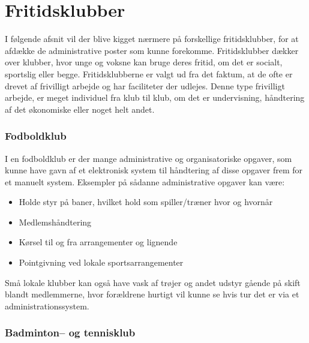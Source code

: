\chapter{Fritidsklubber} \label{chap:Fritidsklubber}

I følgende afsnit vil der blive kigget nærmere på forskellige fritidsklubber, for at afdække de administrative
poster som kunne forekomme. Fritidsklubber dækker over klubber, hvor unge og voksne kan bruge deres fritid, om
det er socialt, sportslig eller begge. Fritidsklubberne er valgt ud fra det faktum, at de ofte er drevet af frivilligt
arbejde og har faciliteter der udlejes. Denne type frivilligt arbejde, er meget individuel fra klub til klub, om det er undervisning, håndtering af det
økonomiske eller noget helt andet.



\subsection{Fodboldklub} \label{Fodbold}

I en fodboldklub er der mange administrative og organisatoriske opgaver, som kunne have gavn af et elektronisk
system til håndtering af disse opgaver frem for et manuelt system. Eksempler på sådanne administrative opgaver
kan være:

\begin{itemize}
  \item Holde styr på baner, hvilket hold som spiller/træner hvor og hvornår
  \item Medlemshåndtering
  \item Kørsel til og fra arrangementer og lignende
  \item Pointgivning ved lokale sportsarrangementer
\end{itemize}

Små lokale klubber kan også have vask af trøjer og andet udstyr gående på skift blandt medlemmerne, hvor
forældrene hurtigt vil kunne se hvis tur det er via et administrationssystem.


\subsection{Badminton-- og tennisklub}

